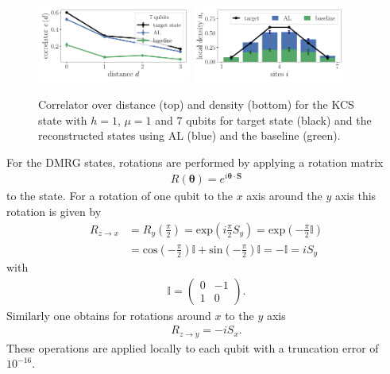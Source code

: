 \documentclass[pra,aps,showpacs,groupedaddress,superscriptaddress,twocolumn,toc=flat,biblatex,footinbib]{revtex4-1}
\renewcommand{\vec}[1]{\bm{#1}}
\begin{document}
\begin{figure}[t]
	\centering
   \includegraphics[width=0.45\textwidth]{Paper/Graphics/LGT_h=1_finite_mu_correlator_7_qubits.pdf}
   \includegraphics[width=0.45\textwidth]{Paper/Graphics/LGT_h=1_finite_mu_density_7_qubits.pdf}
	\caption[]{Correlator over distance (top) and density (bottom) for the KCS state with $h=1$, $\mu=1$ and $7$ qubits for target state (black) and the reconstructed states using AL (blue) and the baseline (green).}
	\label{fig:LGT_h=1_3}
\end{figure}


For the DMRG states, rotations are performed by applying a rotation matrix 
\begin{align}
    R(\vec{\theta})=e^{i\vec{\theta}\cdot \vec{S}}
\end{align}
to the state. For a rotation of one qubit to the $x$ axis around the $y$ axis this rotation is given by
\begin{align*}
    R_{z\to x}&=R_y\left(\frac{\pi}{2}\right)=\mathrm{exp}\left(i\frac{\pi}{2}S_y\right)=\mathrm{exp}\left(-\frac{\pi}{2}\mathbb{I}\right)\\&=\mathrm{cos}(-\frac{\pi}{2})\mathbb{I}+\mathrm{sin}(-\frac{\pi}{2})\mathbb{I}=-\mathbb{I}= iS_y
\end{align*}
with 
\begin{align*}
    \mathbb{I}=\left(\begin{matrix}
0 & -1 \\
1 & 0 
\end{matrix}\right).
\end{align*}
Similarly one obtains for rotations around $x$ to the $y$ axis
\begin{align*}
    R_{z\to y}= -iS_x.
\end{align*}
These operations are applied locally to each qubit with a truncation error of $10^{-16}$. 
\end{document}
